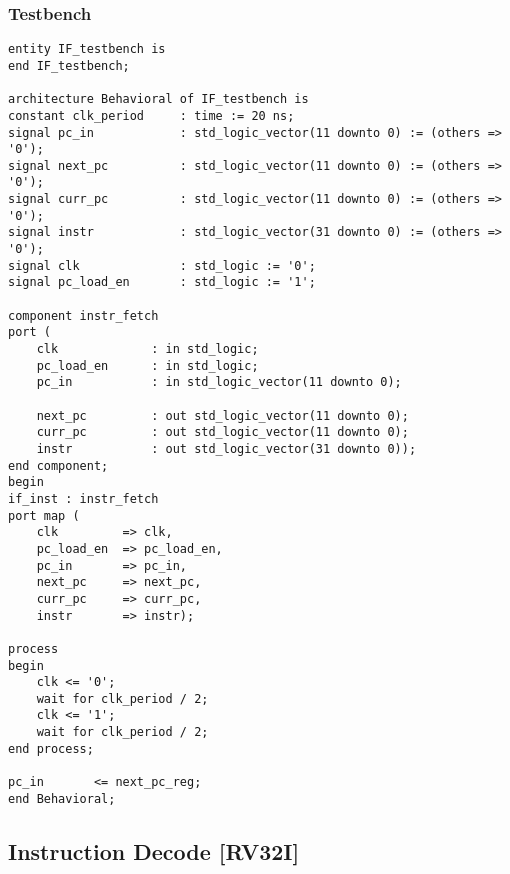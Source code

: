 \subsubsection{Testbench}
\begin{code}
\label{code:IF_TB}
\begin{verbatim}
entity IF_testbench is
end IF_testbench;

architecture Behavioral of IF_testbench is
constant clk_period     : time := 20 ns;
signal pc_in            : std_logic_vector(11 downto 0) := (others => '0');
signal next_pc          : std_logic_vector(11 downto 0) := (others => '0');
signal curr_pc          : std_logic_vector(11 downto 0) := (others => '0');
signal instr            : std_logic_vector(31 downto 0) := (others => '0');
signal clk              : std_logic := '0';
signal pc_load_en       : std_logic := '1';

component instr_fetch
port ( 
    clk             : in std_logic;
    pc_load_en      : in std_logic;
    pc_in           : in std_logic_vector(11 downto 0);
    
    next_pc         : out std_logic_vector(11 downto 0);
    curr_pc         : out std_logic_vector(11 downto 0);
    instr           : out std_logic_vector(31 downto 0));
end component;
begin
if_inst : instr_fetch
port map (
    clk         => clk,
    pc_load_en  => pc_load_en,
    pc_in       => pc_in,
    next_pc     => next_pc,
    curr_pc     => curr_pc,
    instr       => instr);

process
begin
    clk <= '0';
    wait for clk_period / 2;
    clk <= '1';
    wait for clk_period / 2;
end process;

pc_in       <= next_pc_reg;
end Behavioral;
\end{verbatim}
\end{code}
\newpage


\subsection{Instruction Decode [RV32I]}

